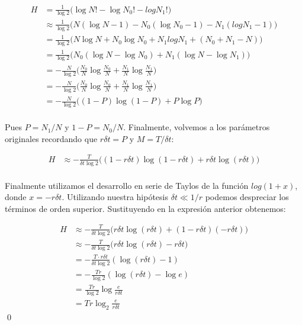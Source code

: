 \documentclass[11pt]{article}
\theoremstyle{plain}
\begin{document}
\[
	\begin{align*}
		H & = \frac{1}{\log 2} \bigg( \log N! - \log N_0! - log N_1! \bigg) \\
		& \approx \frac{1}{\log 2} \bigg( N (\log N - 1) - N_0 (\log N_0 - 1) - N_1 (log N_1 - 1) \bigg) \\
		& = \frac{1}{\log 2} \bigg( N \log N + N_0 \log N_0  + N_1 log N_1 + (N_0 + N_1 - N) \bigg) \\
		& = \frac{1}{\log 2} \bigg( N_0 (\log N - \log N_0) + N_1 (\log N - \log N_1) \bigg) \\
		& = - \frac{N}{\log 2} \bigg( \frac{N_0}{N} \log \frac{N_0}{N} + \frac{N_1}{N} \log \frac{N_1}{N} \bigg) \\
		& = - \frac{N}{\log 2} \bigg( \frac{N_0}{N} \log \frac{N_0}{N} + \frac{N_1}{N} \log \frac{N_1}{N} \bigg) \\
		& = - \frac{N}{\log 2} \bigg( (1-P) \log (1-P) + P \log P \bigg) \\
	\end{align*}	
\]

Pues $P = N_1/N$ y $1 - P = N_0/N$. Finalmente, volvemos a los parámetros originales recordando que $r \delta t = P$ y $M = T / \delta t$:

\[
	\begin{align*}
		H & \approx - \frac{T}{\delta t \log 2} \bigg( (1 - r\delta t) \log (1 - r\delta t) + r\delta t \log (r\delta t) \bigg) \\
	\end{align*}	
\]

Finalmente utilizamos el desarrollo en serie de Taylos de la función $log(1 + x)$, donde $x = -r\delta t$. Utilizando nuestra hipótesis $\delta t \ll 1/r$ podemos despreciar los términos de orden superior. Sustituyendo en la expresión anterior obtenemos:

\[
	\begin{align*}
		H & \approx - \frac{T}{\delta t \log 2} \bigg( r\delta t \log (r\delta t) + (1 - r\delta t) (- r\delta t) \bigg) \\
		& \approx - \frac{T}{\delta t \log 2} \bigg( r\delta t \log (r\delta t) - r\delta t \bigg) \\
		& = - \frac{T \cdot r\delta t}{\delta t \log 2} (\log (r\delta t) - 1) \\
		& = - \frac{Tr}{\log 2} (\log (r\delta t) - \log e) \\
		& = \frac{Tr}{\log 2} \log \frac{e}{r\delta t} \\
		& = Tr \log_2 \frac{e}{r\delta t}
	\end{align*}
\]
\qed
\end{document}

